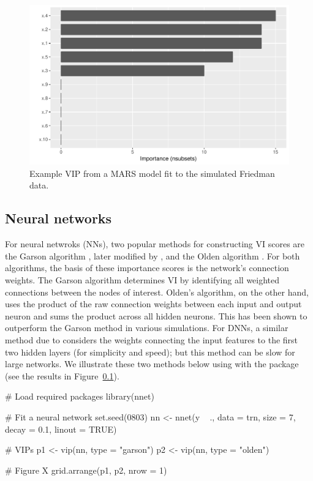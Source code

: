 \begin{figure}[!htb]
  \centering 
  \includegraphics[width=1\linewidth]{figures/vip-earth} 
  \caption{Example VIP from a MARS model fit to the simulated Friedman data.}
  \label{fig:vip-earth}
\end{figure}

\subsection{Neural networks}

For neural netwroks (NNs), two popular methods for constructing VI scores are the Garson algorithm \citep{interpreting-garson-1991}, later modified by \citet{back-goh-1995}, and the Olden algorithm \citep{accurate-olden-2004}. For both algorithms, the basis of these importance scores is the network’s connection weights. The Garson algorithm determines VI by identifying all weighted connections between the nodes of interest. Olden’s algorithm, on the other hand, uses the product of the raw connection weights between each input and output neuron and sums the product across all hidden neurons. This has been shown to outperform the Garson method in various simulations. For DNNs, a similar method due to \citet{data-gedeon-1997} considers the weights connecting the input features to the first two hidden layers (for simplicity and speed); but this method can be slow for large networks. We illustrate these two methods below using  with the  package \citep{nnet-pkg} (see the results in Figure~\ref{}).

\begin{example}
# Load required packages
library(nnet)

# Fit a neural network
set.seed(0803)
nn <- nnet(y ~ ., data = trn, size = 7, decay = 0.1, linout = TRUE)

# VIPs
p1 <- vip(nn, type = "garson")
p2 <- vip(nn, type = "olden")

# Figure X
grid.arrange(p1, p2, nrow = 1)
\end{example}

